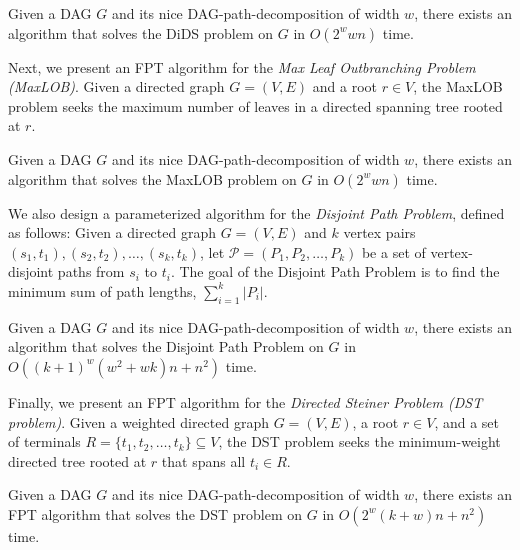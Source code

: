 \documentclass[runningheads]{llncs}
\theoremstyle{plain}
\theoremstyle{definition}
\begin{document}
\begin{theorem}
    Given a DAG \(G\) and its nice DAG-path-decomposition of width \(w\), there exists an algorithm that solves the DiDS problem on \(G\) in \(O(2^w w n)\) time.  
\end{theorem}

Next, we present an FPT algorithm for the \emph{Max Leaf Outbranching Problem (MaxLOB)}.  
Given a directed graph \(G = (V, E)\) and a root \(r \in V\), the MaxLOB problem seeks the maximum number of leaves in a directed spanning tree rooted at \(r\). 

\begin{theorem}\label{alg_lob}
    Given a DAG \(G\) and its nice DAG-path-decomposition of width \(w\), there exists an algorithm that solves the MaxLOB problem on \(G\) in \(O(2^w w n)\) time.  
\end{theorem}

We also design a parameterized algorithm for the \emph{Disjoint Path Problem}, defined as follows:  
Given a directed graph \(G = (V, E)\) and \(k\) vertex pairs \((s_1, t_1), (s_2, t_2), \dots, (s_k, t_k)\), let \(\mathcal{P} = (P_1, P_2, \dots, P_k)\) be a set of vertex-disjoint paths from \(s_i\) to \(t_i\).  
The goal of the Disjoint Path Problem is to find the minimum sum of path lengths, \(\sum_{i=1}^{k} |P_i|\).  

\begin{theorem}
    Given a DAG \(G\) and its nice DAG-path-decomposition of width \(w\), there exists an algorithm that solves the Disjoint Path Problem on \(G\) in \(O((k+1)^w (w^2 + wk) n + n^2)\) time.  
\end{theorem}

Finally, we present an FPT algorithm for the \emph{Directed Steiner Problem (DST problem)}.  
Given a weighted directed graph \(G = (V, E)\), a root \(r \in V\), and a set of terminals \(R = \{t_1, t_2, \dots, t_k\} \subseteq V\), the DST problem seeks the minimum-weight directed tree rooted at \(r\) that spans all \(t_i \in R\).  

\begin{theorem}
    Given a DAG \(G\) and its nice DAG-path-decomposition of width \(w\), there exists an FPT algorithm that solves the DST problem on \(G\) in \(O(2^w (k+w) n + n^2)\) time.  
\end{theorem}
\end{document}
